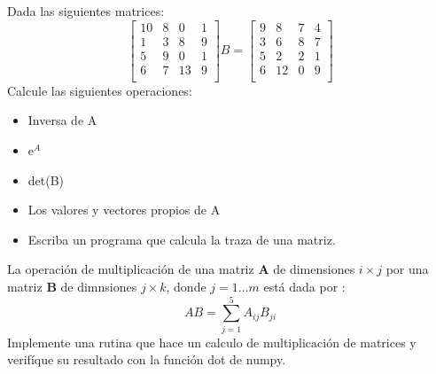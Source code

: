 \documentclass[5pt]{exam}
\begin{document}
{\begin{questions}
\item Dada las siguientes matrices:
\[
\begin{bmatrix}
      10  & 8  & 0 &  1  \\
      1   &  3 & 8 &  9 \\
      5   &  9 & 0 &  1 \\
      6   &  7 & 13 & 9 \\
\end{bmatrix}
B =
\begin{bmatrix}
      9  & 8  & 7 &  4  \\
      3   &  6 & 8 &  7 \\
      5   &  2 & 2 &  1 \\
      6   &  12 & 0 & 9 \\
\end{bmatrix}
\]
Calcule las siguientes operaciones:
\begin{itemize}
    \item Inversa de A
    \item   e$^A$
    \item det(B)
    \item Los valores y vectores propios de A
    \item Escriba un programa que calcula la traza de una matriz.
\end{itemize}

\item La operación de multiplicación de una matriz \textbf{A} de dimensiones $i\times j$ por una  matriz \textbf{B} de 
dimnsiones $j\times k $, donde $j=1\dots m $  está dada por :
\begin{equation}
    \label{} AB = \sum_{j=1}^5 A_{ij}B_{ji}
\end{equation}
Implemente una rutina que hace un calculo de multiplicación de matrices y verifíque su resultado con la función
dot de numpy.


\end{questions}}
\end{document}
